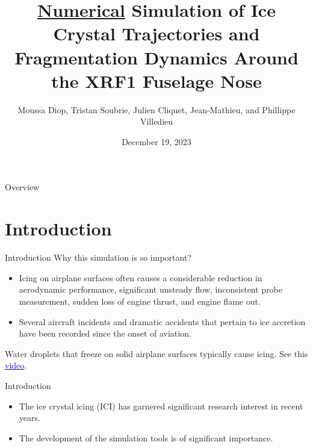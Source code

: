 \documentclass[aspectratio=169,xcolor=dvipsnames]{beamer}
\title[Num. Simulation of Ice Crystal Traj. \& Frag. Dyn.]{\href{https://sinews.siam.org/Current-Issue}{Numerical} Simulation of Ice Crystal Trajectories and Fragmentation Dynamics Around the XRF1 Fuselage Nose} %
\author[Moussa Diop, Tristan Soubrie, Julien Cliquet, Jean-Mathieu, and Phillippe Villedieu]{Moussa Diop, Tristan Soubrie, Julien Cliquet, Jean-Mathieu, and Phillippe Villedieu}
\institute[SIAM NEWS DECEMBER 2023]{Department of Mathematics \newline National Central University}
\date{December 19, 2023} %
\begin{document}
\begin{frame}[plain]
    \titlepage
\end{frame}

\begin{frame}{Overview}
    \tableofcontents
\end{frame}

\section{Introduction}
\begin{frame}{Introduction}
Why this simulation is so important?
    \begin{itemize}
    \item Icing on airplane surfaces often causes a considerable reduction in aerodynamic performance, significant unsteady flow, inconsistent probe measurement, sudden loss of engine thrust, and engine flame out. 
    \item Several aircraft incidents and dramatic accidents that pertain to ice accretion have been recorded since the onset of aviation. 
    \end{itemize}
    Water droplets that freeze on solid airplane surfaces typically cause icing. See this \href{https://www.youtube.com/watch?v=_ps7-9KfMEc}{\textcolor{blue}{video}}.
\end{frame}

\begin{frame}{Introduction}
    \begin{itemize}
    \item The ice crystal icing (ICI) has garnered significant research interest in recent years. 
    \item The development of the simulation tools is of significant importance.
    \end{itemize}
\end{frame}
\end{document}
